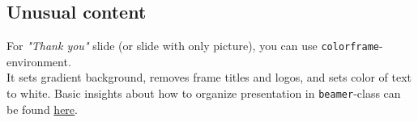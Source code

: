 \documentclass[aspectratio=169]{beamer}
\begin{document}
\subsection{Unusual content}
\begin{colorframe}
For \emph{"Thank you"} slide (or slide with only picture), you can use \texttt{colorframe}-environment.
\\
It sets gradient background, removes frame titles and logos, and sets color of text to white.
\vskip1cm
Basic insights about how to organize presentation in \texttt{beamer}-class can be found \href{http://web.mit.edu/rsi/www/pdfs/beamer-tutorial.pdf}{\color{nordgold}here}.
\end{colorframe}
\end{document}
